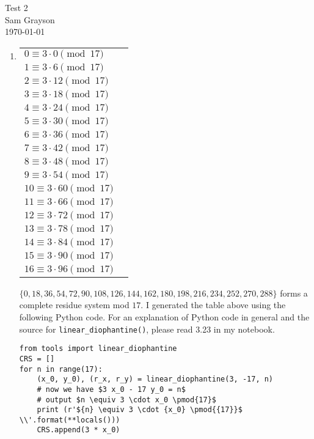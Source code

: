 \documentclass[12pt,letterpaper]{article}
\begin{document}

\doublespacing
\begin{center}
{\Large Test 2} \\[14pt]
{\large Sam Grayson} \\[0pt]
{\today} \\
\end{center}

\singlespacing
\setlength{\parindent}{0pt}

\begin{enumerate}[leftmargin=0mm]
\item
\begin{tabular}[t]{l l}
$0 \equiv 3 \cdot 0 \pmod{17}$ \\
$1 \equiv 3 \cdot 6 \pmod{17}$ \\
$2 \equiv 3 \cdot 12 \pmod{17}$ \\
$3 \equiv 3 \cdot 18 \pmod{17}$ \\
$4 \equiv 3 \cdot 24 \pmod{17}$ \\
$5 \equiv 3 \cdot 30 \pmod{17}$ \\
$6 \equiv 3 \cdot 36 \pmod{17}$ \\
$7 \equiv 3 \cdot 42 \pmod{17}$ \\
$8 \equiv 3 \cdot 48 \pmod{17}$ \\
$9 \equiv 3 \cdot 54 \pmod{17}$ \\
$10 \equiv 3 \cdot 60 \pmod{17}$ \\
$11 \equiv 3 \cdot 66 \pmod{17}$ \\
$12 \equiv 3 \cdot 72 \pmod{17}$ \\
$13 \equiv 3 \cdot 78 \pmod{17}$ \\
$14 \equiv 3 \cdot 84 \pmod{17}$ \\
$15 \equiv 3 \cdot 90 \pmod{17}$ \\
$16 \equiv 3 \cdot 96 \pmod{17}$ \\
\end{tabular}

\(\{0, 18, 36, 54, 72, 90, 108, 126, 144, 162, 180, 198, 216, 234, 252, 270, 288\}\) forms a complete residue system mod \(17\). I generated the table above using the following Python code. For an explanation of Python code in general and the source for \texttt{linear_diophantine()}, please read 3.23 in my notebook.

\begin{verbatim}
from tools import linear_diophantine
CRS = []
for n in range(17):
    (x_0, y_0), (r_x, r_y) = linear_diophantine(3, -17, n)
    # now we have $3 x_0 - 17 y_0 = n$
    # output $n \equiv 3 \cdot x_0 \pmod{17}$
    print (r'${n} \equiv 3 \cdot {x_0} \pmod{{17}}$ \\'.format(**locals()))
    CRS.append(3 * x_0)


\end{verbatim}
\end{enumerate}
\end{document}
